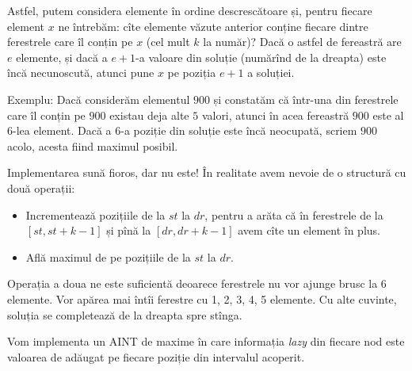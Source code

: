 Astfel, putem considera elemente în ordine descrescătoare și, pentru fiecare element $x$ ne întrebăm: cîte elemente văzute anterior conține fiecare dintre ferestrele care îl conțin pe $x$ (cel mult $k$ la număr)? Dacă o astfel de fereastră are $e$ elemente, și dacă a $e+1$-a valoare din soluție (numărînd de la dreapta) este încă necunoscută, atunci pune $x$ pe poziția $e+1$ a soluției.

Exemplu: Dacă considerăm elementul $900$ și constatăm că într-una din ferestrele care îl conțin pe $900$ existau deja alte $5$ valori, atunci în acea fereastră $900$ este al $6$-lea element. Dacă a $6$-a poziție din soluție este încă neocupată, scriem $900$ acolo, acesta fiind maximul posibil.

Implementarea sună fioros, dar nu este! În realitate avem nevoie de o structură cu două operații:

\begin{itemize}
  \item Incrementează pozițiile de la $st$ la $dr$, pentru a arăta că în ferestrele de la $[st, st+k-1]$ și pînă la $[dr, dr + k - 1]$ avem cîte un element în plus.
  \item Află maximul de pe pozițiile de la $st$ la $dr$.
\end{itemize}

Operația a doua ne este suficientă deoarece ferestrele nu vor ajunge brusc la 6 elemente. Vor apărea mai întîi ferestre cu 1, 2, 3, 4, 5 elemente. Cu alte cuvinte, soluția se completează de la dreapta spre stînga.

Vom implementa un AINT de maxime în care informația \textit{lazy} din fiecare nod este valoarea de adăugat pe fiecare poziție din intervalul acoperit.
